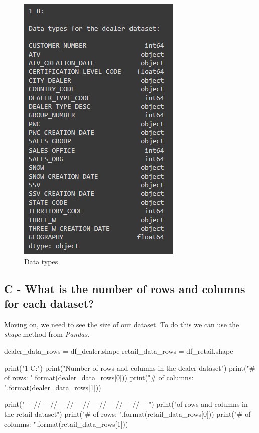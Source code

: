 \documentclass[a4paper, 12pt]{article}
\begin{document}
\begin{figure}[!htb]
	\caption{\label{img_01} Data types}
	\begin{center}
		\includegraphics[scale=1.10]{img_01.PNG}
	\end{center}
\end{figure}

\subsection{C - What is the number of rows and columns for each dataset?}

Moving on, we need to see the size of our dataset. To do this we can use the \textit{shape} method from \textit{Pandas}.

\begin{python}
	dealer_data_rows = df_dealer.shape
	retail_data_rows = df_retail.shape
\end{python}

\begin{python}
	print("1 C:\n")
	print("Number of rows and columns in the dealer dataset")
	print("# of rows: {}".format(dealer_data_rows[0]))
	print("# of columns: {}\n".format(dealer_data_rows[1]))
	
	print("----//----//----//----//----//----//----//----")
	print("\nNumber of rows and columns in the retail dataset")
	print("# of rows: {}".format(retail_data_rows[0]))
	print("# of columns: {}".format(retail_data_rows[1]))
\end{python}
\end{document}

